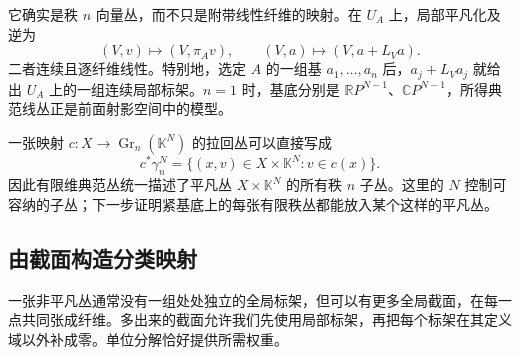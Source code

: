 它确实是秩 \(n\) 向量丛，而不只是附带线性纤维的映射。在 \(U_A\) 上，局部平凡化及逆为
\[
	(V,v)\longmapsto(V,\pi_Av),\qquad
	(V,a)\longmapsto(V,a+L_Va).
\]
二者连续且逐纤维线性。特别地，选定 \(A\) 的一组基 \(a_1,\ldots,a_n\) 后，\(a_j+L_Va_j\) 就给出 \(U_A\) 上的一组连续局部标架。\(n=1\) 时，基底分别是 \(\mathbb RP^{N-1}\)、\(\mathbb CP^{N-1}\)，所得典范线丛正是前面射影空间中的模型。

\ProseParagraphBreak

一张映射 \(c:X\to\operatorname{Gr}_n(\mathbb K^N)\) 的拉回丛可以直接写成
\[
	c^*\gamma_n^N=\{(x,v)\in X\times\mathbb K^N:v\in c(x)\}.
\]
因此有限维典范丛统一描述了平凡丛 \(X\times\mathbb K^N\) 的所有秩 \(n\) 子丛。这里的 \(N\) 控制可容纳的子丛；下一步证明紧基底上的每张有限秩丛都能放入某个这样的平凡丛。

\subsection{由截面构造分类映射}
\label{g2:subsec:1902:02}
一张非平凡丛通常没有一组处处独立的全局标架，但可以有更多全局截面，在每一点共同张成纤维。多出来的截面允许我们先使用局部标架，再把每个标架在其定义域以外补成零。单位分解恰好提供所需权重。

